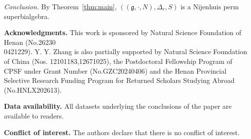 \documentclass[11pt]{article}
\theoremstyle{definition}
\newcommand{\g}{\mathfrak{g}}
\begin{document}
\medskip\noindent\emph{Conclusion.}
By Theorem~\ref{thm:main}, $((\g,\cdot,N),\Delta_r,S)$ is a Nijenhuis perm superbialgebra.


\bigskip
\noindent
{\bf Acknowledgments.} This work is sponsored by Natural Science Foundation of Henan (No.26230\\0421229). Y. Y. Zhang is also partially supported by Natural Science Foundation of China (Nos. 12101183,12671025), the Postdoctoral Fellowship Program of CPSF under Grant Number (No.GZC20240406) and the Henan Provincial Selective Research Funding Program for Returned Scholars Studying Abroad (No.HNLX202613).

\smallskip
\noindent
{\bf Data availability.} All datasets underlying the conclusions of the paper are available to readers.

\smallskip
\noindent
{\bf Conflict of interest.} The authors declare that there is no conflict of interest.
\end{document}

